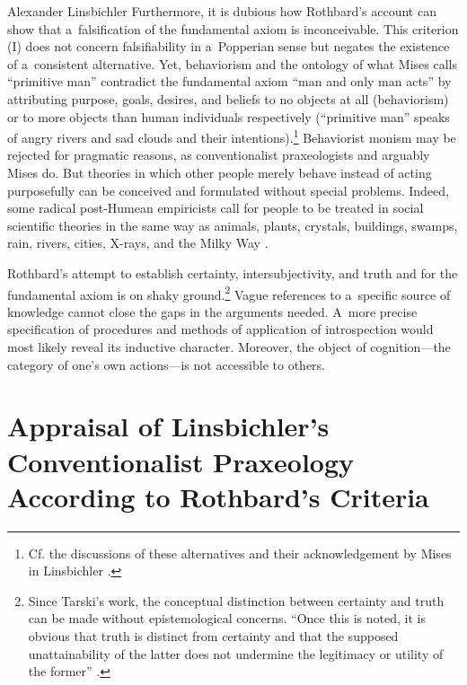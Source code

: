 \begin{artengenv}{Alexander Linsbichler}
Furthermore, it is dubious how Rothbard's account can show that a~falsification of the fundamental axiom is inconceivable. This criterion (I) does not concern falsifiability in a~Popperian sense but negates the existence of a~consistent alternative. Yet, behaviorism and the ontology of what Mises calls ``primitive man'' contradict the fundamental axiom ``man and only man acts'' by attributing purpose, goals, desires, and beliefs to no objects at all (behaviorism) or to more objects than human individuals respectively (``primitive man'' speaks of angry rivers and sad clouds and their intentions).\footnote{Cf. the discussions of these alternatives and their acknowledgement by Mises in Linsbichler 
\parencites*[][]{linsbichler_was_2017}[][]{linsbichler_austrian_2021}.%
} Behaviorist monism may be rejected for pragmatic reasons, as conventionalist praxeologists and arguably Mises do. But theories in which other people merely behave instead of acting purposefully can be conceived and formulated without special problems. Indeed, some radical post-Humean empiricists call for people to be treated in social scientific theories in the same way as animals, plants, crystals, buildings, swamps, rain, rivers, cities, X-rays, and the Milky Way 
\parencites[see][]{neurath_foundations_1944}[][]{neurath_foundations_1970}.%




Rothbard's attempt to establish certainty, intersubjectivity, and truth and for the fundamental axiom is on shaky ground.\footnote{Since Tarski's work, the conceptual distinction between certainty and truth can be made without epistemological concerns. ``Once this is noted, it is obvious that truth is distinct from certainty and that the supposed unattainability of the latter does not undermine the legitimacy or utility of the former'' 
\parencite[][p.32]{soames_understanding_1999}.%
} Vague references to a~specific source of knowledge cannot close the gaps in the arguments needed. A~more precise specification of procedures and methods of application of introspection would most likely reveal its inductive character. Moreover, the object of cognition---the category of one's own actions---is not accessible to others.



\section{Appraisal of Linsbichler's Conventionalist Praxeology According to Rothbard's Criteria}



\end{artengenv}

